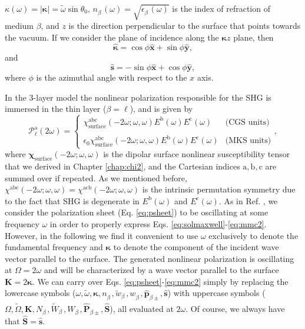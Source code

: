 $\kappa(\omega)=\vert\boldsymbol{\kappa}\vert = \tilde{\omega}\sin\theta_{0}$,
$n^{\phantom{A}}_{\beta}(\omega)=\sqrt{\epsilon^{\phantom{A}}_{\beta}(\omega)}$
is the index of refraction of medium $\beta$, and $z$ is the direction
perpendicular to the surface that points towards the vacuum. If we consider the
plane of incidence along the $\boldsymbol{\kappa}z$ plane, then
\begin{equation}\label{eq:mc1}
\hat{\boldsymbol{\kappa}} = \cos\phi\hat{\mathbf{x}} + \sin\phi\hat{\mathbf{y}},
\end{equation}
and
\begin{equation}\label{eq:mmc2}
\hat{\mathbf{s}} = -\sin\phi\hat{\mathbf{x}} + \cos\phi\hat{\mathbf{y}},
\end{equation}
where $\phi$ is the azimuthal angle with respect to the $x$ axis.

In the 3-layer model the nonlinear polarization responsible for the SHG is
immersed in the thin layer ($\beta=\ell$), and is given by
\begin{equation}\label{eq:tres}
\mathcal{P}^{\mathrm{a}}_{\ell}(2\omega) =
\left\{
\begin{array}{cc}
\chi^{\mathrm{abc}}_{\mathrm{surface}}(-2\omega;\omega,\omega)
    E^{\mathrm{b}}(\omega)E^{\mathrm{c}}(\omega)
    & \text{(CGS units)}\\\\
\epsilon_{0}\chi^{\mathrm{abc}}_{\mathrm{surface}}(-2\omega;\omega,\omega)
    E^{\mathrm{b}}(\omega)E^{\mathrm{c}}(\omega)
    & \text{(MKS units)}
\end{array}
\right.,
\end{equation}
where $\boldsymbol{\chi}_{\mathrm{surface}}(-2\omega;\omega,\omega)$ is the
dipolar surface nonlinear susceptibility tensor that we derived in Chapter
\ref{chap:chi2}, and the Cartesian indices $\mathrm{a,b,c}$ are summed over if
repeated. As we mentioned before, $\chi^{\mathrm{abc}}(-2\omega;\omega,\omega) =
\chi^{\mathrm{acb}}(-2\omega;\omega,\omega)$ is the intrinsic permutation
symmetry due to the fact that SHG is degenerate in $E^{\mathrm{b}}(\omega)$ and
$E^{\mathrm{c}}(\omega)$. As in Ref. \cite{mizrahiJOSA88}, we consider the
polarization sheet (Eq. \eqref{eq:psheet}) to be oscillating at some frequency
$\omega$ in order to properly express Eqs.
\eqref{eq:solmaxwell}-\eqref{eq:mmc2}. However, in the following we find it
convenient to use $\omega$ exclusively to denote the fundamental frequency and
$\boldsymbol{\kappa}$ to denote the component of the incident wave vector
parallel to the surface. The generated nonlinear polarization is oscillating at
$\Omega = 2\omega$ and will be characterized by a wave vector parallel to the
surface $\mathbf{K} = 2\boldsymbol{\kappa}$. We can carry over Eqs.
\eqref{eq:psheet}-\eqref{eq:mmc2} simply by replacing the lowercase symbols
($\omega,\tilde{\omega},\boldsymbol{\kappa},n^{\phantom{A}}_{\beta},
\tilde{w}^{\phantom{A}}_{\beta},w^{\phantom{A}}_{\beta},
\hat{\mathbf{p}}^{\phantom{A}}_{\beta\pm},\hat{\mathbf{s}}$) with uppercase
symbols ($\Omega,\tilde{\Omega},\mathbf{K},N^{\phantom{A}}_{\beta},
\tilde{W}^{\phantom{A}}_{\beta},W^{\phantom{A}}_{\beta},
\hat{\mathbf{P}}_{\beta\pm},\hat{\mathbf{S}}$), all evaluated at $2\omega$. Of
course, we always have that $\hat{\mathbf{S}}=\hat{\mathbf{s}}$.

